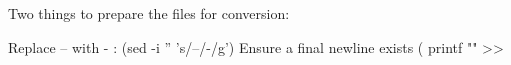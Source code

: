 Two things to prepare the files for conversion:

Replace -- with - :
(sed -i '' 's/--/-/g')
Ensure a final newline exists (
printf "\n" >>

